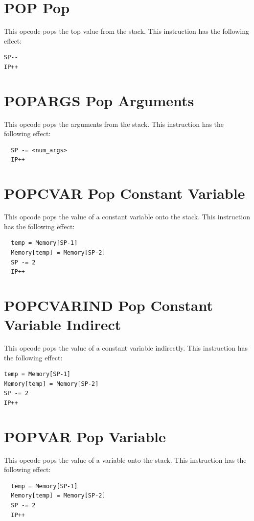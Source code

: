 \documentclass[11pt,a4paper,oneside]{book}
\begin{document}
\pagebreak
\section[POP]{\texorpdfstring{POP \hfill Pop}{POP -- Pop}}
This opcode pops the top value from the stack. This instruction has the following effect:
\begin{verbatim}
SP--
IP++
\end{verbatim}

\pagebreak
\section[POPARGS]{\texorpdfstring{POPARGS \hfill Pop Arguments}{POPARGS -- Pop Arguments}}
This opcode pops the arguments from the stack. This instruction has the following effect:
\begin{verbatim}
  SP -= <num_args>
  IP++
\end{verbatim}

\pagebreak
\section[POPCVAR]{\texorpdfstring{POPCVAR \hfill Pop Constant Variable}{POPCVAR -- Pop Constant Variable}}
This opcode pops the value of a constant variable onto the stack. This instruction has the following effect:
\begin{verbatim}
  temp = Memory[SP-1]
  Memory[temp] = Memory[SP-2]
  SP -= 2
  IP++
\end{verbatim}

\pagebreak
\section[POPCVARIND]{\texorpdfstring{POPCVARIND \hfill Pop Constant Variable Indirect}{POPCVARIND -- Pop Constant Variable Indirect}}
This opcode pops the value of a constant variable indirectly. This instruction has the following effect:
\begin{verbatim}
temp = Memory[SP-1]
Memory[temp] = Memory[SP-2]
SP -= 2
IP++
\end{verbatim}

\pagebreak
\section[POPVAR]{\texorpdfstring{POPVAR \hfill Pop Variable}{POPVAR -- Pop Variable}}
This opcode pops the value of a variable onto the stack. This instruction has the following effect:
\begin{verbatim}
  temp = Memory[SP-1]
  Memory[temp] = Memory[SP-2]
  SP -= 2
  IP++
\end{verbatim}
\end{document}
